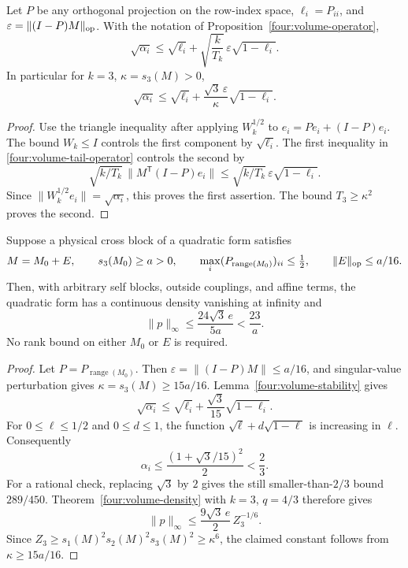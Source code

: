\begin{lemma}
\label{four:volume-stability}
Let \(P\) be any orthogonal projection on the row-index space,
\(\ell_i=P_{ii}\), and
\(\varepsilon=\|(I-P)M\|_{\rm op}\).  With the notation of
Proposition~\ref{four:volume-operator},
\begin{equation}\label{four:volume-stability-tail}
 \sqrt{\alpha_i}
 \leq\sqrt{\ell_i}
      +\sqrt{\frac{k}{T_k}}\,\varepsilon\sqrt{1-\ell_i}.
\end{equation}
In particular for \(k=3\), \(\kappa=s_3(M)>0\),
\begin{equation}\label{four:volume-stability-three}
 \sqrt{\alpha_i}
 \leq\sqrt{\ell_i}
      +\frac{\sqrt3\,\varepsilon}{\kappa}\sqrt{1-\ell_i}.
\end{equation}
\end{lemma}
\begin{proof}
Use the triangle inequality after applying \(W_k^{1/2}\) to
\(e_i=Pe_i+(I-P)e_i\).  The bound \(W_k\leq I\) controls
the first component by \(\sqrt{\ell_i}\).
The first inequality in \eqref{four:volume-tail-operator}
controls the second by
\[
 \sqrt{k/T_k}\,\|M^{\mathsf T}(I-P)e_i\|
 \leq\sqrt{k/T_k}\,\varepsilon\sqrt{1-\ell_i}.
\]
Since \(\|W_k^{1/2}e_i\|=\sqrt{\alpha_i}\), this proves the
first assertion.  The bound \(T_3\geq\kappa^2\) proves the second.
\end{proof}

\begin{theorem}
\label{four:near-diffuse}
Suppose a physical cross block of a quadratic form satisfies
\[
 M=M_0+E,\qquad s_3(M_0)\geq a>0,\qquad
 \max_i(P_{\operatorname{range}(M_0)})_{ii}\leq\tfrac12,
 \qquad \|E\|_{\rm op}\leq a/16.
\]
Then, with arbitrary self blocks, outside couplings, and affine
terms, the quadratic form has a continuous density vanishing
at infinity and
\begin{equation}\label{four:near-diffuse-bound}
 \|p\|_\infty\leq\frac{24\sqrt3\,e}{5a}<\frac{23}{a}.
\end{equation}
No rank bound on either \(M_0\) or \(E\) is required.
\end{theorem}
\begin{proof}
Let \(P=P_{\operatorname{range}(M_0)}\).
Then \(\varepsilon=\|(I-P)M\|\leq a/16\), and singular-value
perturbation gives \(\kappa=s_3(M)\geq15a/16\).
Lemma~\ref{four:volume-stability} gives
\[
 \sqrt{\alpha_i}\leq\sqrt{\ell_i}
                    +\frac{\sqrt3}{15}\sqrt{1-\ell_i}.
\]
For \(0\leq\ell\leq1/2\) and \(0\leq d\leq1\), the function
\(\sqrt\ell+d\sqrt{1-\ell}\) is increasing in \(\ell\).
Consequently
\[
 \alpha_i\leq\frac{(1+\sqrt3/15)^2}{2}<\frac23.
\]
For a rational check, replacing \(\sqrt3\) by \(2\) gives
the still smaller-than-\(2/3\) bound \(289/450\).
Theorem~\ref{four:volume-density} with \(k=3\), \(q=4/3\)
therefore gives
\[
 \|p\|_\infty\leq\frac{9\sqrt3\,e}{2}\,Z_3^{-1/6}.
\]
Since \(Z_3\geq s_1(M)^2s_2(M)^2s_3(M)^2\geq\kappa^6\),
the claimed constant follows from \(\kappa\geq15a/16\).
\end{proof}

